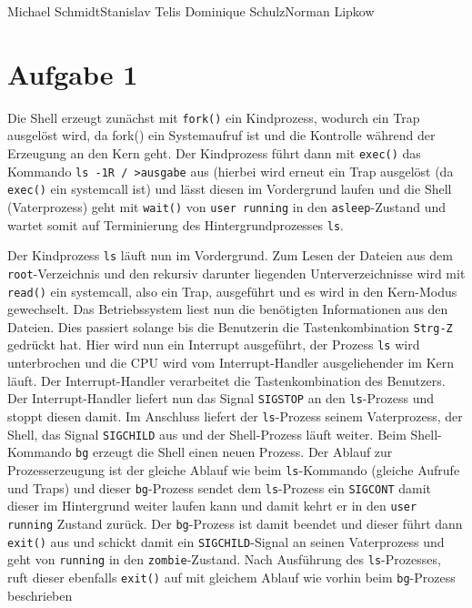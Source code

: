 \documentclass{ti2}
\begin{document}

\lstset{escapechar=@, numbers=left}


%
                {Michael Schmidt}{Stanislav Telis}%
                {Dominique Schulz}{Norman Lipkow}%
               
\section*{Aufgabe 1}

Die Shell erzeugt zunächst mit \texttt{fork()} ein Kindprozess, wodurch ein Trap ausgelöst wird, da fork() ein Systemaufruf ist und die Kontrolle während der Erzeugung an den Kern geht. Der Kindprozess führt dann mit \texttt{exec()} das Kommando \texttt{ls -1R / \textgreater ausgabe} aus (hierbei wird erneut ein Trap ausgelöst (da \texttt{exec()} ein systemcall ist) und lässt diesen im Vordergrund laufen und die Shell (Vaterprozess) geht mit \texttt{wait()} von \texttt{user running} in den \texttt{asleep}-Zustand und wartet somit auf Terminierung des Hintergrundprozesses \texttt{ls}. 

Der Kindprozess \texttt{ls} läuft nun im Vordergrund. Zum Lesen der Dateien aus dem \texttt{root}-Verzeichnis und den rekursiv darunter liegenden Unterverzeichnisse wird mit \texttt{read()} ein systemcall, also ein Trap, ausgeführt und es wird in den Kern-Modus gewechselt. Das Betriebssystem liest nun die benötigten Informationen aus den Dateien. Dies passiert solange bis die Benutzerin die Tastenkombination \texttt{Strg-Z} gedrückt hat. Hier wird nun ein Interrupt ausgeführt, der Prozess \texttt{ls} wird unterbrochen und die CPU wird vom Interrupt-Handler \glqq ausgeliehen\grqq der im Kern läuft. Der Interrupt-Handler verarbeitet die Tastenkombination des Benutzers. Der Interrupt-Handler liefert nun das Signal \texttt{SIGSTOP} an den \texttt{ls}-Prozess und stoppt diesen damit. Im Anschluss liefert der \texttt{ls}-Prozess seinem Vaterprozess, der Shell, das Signal \texttt{SIGCHILD} aus und der Shell-Prozess läuft weiter. Beim Shell-Kommando \texttt{bg} erzeugt die Shell einen neuen Prozess. Der Ablauf zur Prozesserzeugung ist der gleiche Ablauf wie beim \texttt{ls}-Kommando (gleiche Aufrufe und Traps) und dieser \texttt{bg}-Prozess sendet dem \texttt{ls}-Prozess ein \texttt{SIGCONT} damit dieser im Hintergrund weiter laufen kann und damit kehrt er in den \texttt{user running} Zustand zurück. Der \texttt{bg}-Prozess ist damit beendet und dieser führt dann \texttt{exit()} aus und schickt damit ein \texttt{SIGCHILD}-Signal an seinen Vaterprozess und geht von \texttt{running} in den \texttt{zombie}-Zustand. Nach Ausführung des \texttt{ls}-Prozesses, ruft dieser ebenfalls \texttt{exit()} auf mit gleichem Ablauf wie vorhin beim \texttt{bg}-Prozess beschrieben
\end{document}
